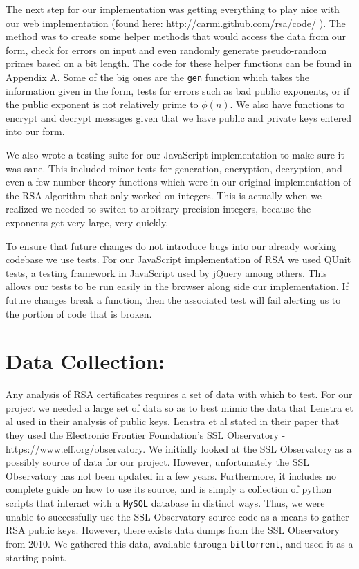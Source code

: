 \documentclass[12pt]{article}
\newcommand{\ty}[1]{\texttt{#1}}
\begin{document}
The next step for our implementation was getting everything to play nice with
our web implementation (found here: http://carmi.github.com/rsa/code/ ). The 
method was to create some helper methods that would access the data from our 
form, check for errors on input and
even randomly generate pseudo-random primes based on a bit length. The code for
these helper functions can be found in Appendix A. Some of the big ones are the
\ty{gen} function which takes the information given in the form, tests for
errors such as bad public exponents, or if the public exponent is not relatively
prime to $\phi(n)$. We also have functions to encrypt and decrypt messages given
that we have public and private keys entered into our form.

We also wrote a testing suite for our JavaScript implementation to make sure it
was sane. This included minor tests for generation, encryption, decryption, and
even a few number theory functions which were in our original implementation of
the RSA algorithm that only worked on integers. This is actually when we
realized we needed to switch to arbitrary precision integers, because the
exponents get very large, very quickly.






To ensure that future changes do not introduce bugs into our already working codebase we use tests. For our JavaScript implementation of RSA we used QUnit tests, a testing framework in JavaScript used by jQuery among others. This allows our tests to be run easily in the browser along side our implementation. If future changes break a function, then the associated test will fail alerting us to the portion of code that is broken.




\section{Data Collection:}
Any analysis of RSA certificates requires a set of data with which to test. For
our project we needed a large set of data so as to best mimic the data that
Lenstra et al used in their analysis of public keys. Lenstra et al stated in their paper
that they used the Electronic Frontier Foundation's SSL Observatory -
https://www.eff.org/observatory. We initially looked at the SSL Observatory as a
possibly source of data for our project. However, unfortunately the SSL
Observatory has not been updated in a few years. Furthermore, it includes no
complete guide on how to use its source, and is simply a collection of python
scripts that interact with a \ty{MySQL} database in distinct ways. Thus, we were
unable to successfully use the SSL Observatory source code as a means to gather
RSA public keys. However, there exists data dumps from the SSL Observatory from
2010. We gathered this data, available through \ty{bittorrent}, and used it as a
starting point.
\end{document}
